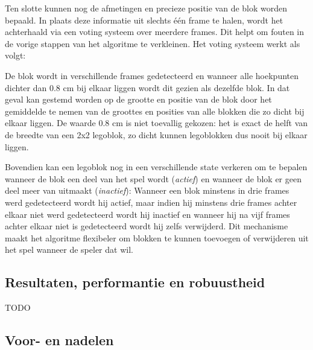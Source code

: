 Ten slotte kunnen nog de afmetingen en precieze positie van de blok worden bepaald. In plaats deze informatie uit slechts \'e\'en frame te halen, wordt het achterhaald via een voting systeem over meerdere frames. Dit helpt om fouten in de vorige stappen van het algoritme te verkleinen. Het voting systeem werkt als volgt: 

De blok wordt in verschillende frames gedetecteerd en wanneer alle hoekpunten dichter dan 0.8 cm bij elkaar liggen wordt dit gezien als dezelfde blok. In dat geval kan gestemd worden op de grootte en positie van de blok door het gemiddelde te nemen van de groottes en posities van alle blokken die zo dicht bij elkaar liggen. De waarde 0.8 cm is niet toevallig gekozen: het is exact de helft van de breedte van een 2x2 legoblok, zo dicht kunnen legoblokken dus nooit bij elkaar liggen.

Bovendien kan een legoblok nog in een verschillende state verkeren om te bepalen wanneer de blok een deel van het spel wordt (\textit{actief}) en wanneer de blok er geen deel meer van uitmaakt (\textit{inactief}): Wanneer een blok minstens in drie frames werd gedetecteerd wordt hij actief, maar indien hij minstens drie frames achter elkaar niet werd gedetecteerd wordt hij inactief en wanneer hij na vijf frames achter elkaar niet is gedetecteerd wordt hij zelfs verwijderd. Dit mechanisme maakt het algoritme flexibeler om blokken te kunnen toevoegen of verwijderen uit het spel wanneer de speler dat wil.

\subsection{Resultaten, performantie en robuustheid}



TODO %

\subsection{Voor- en nadelen}

